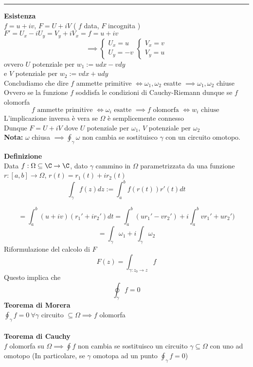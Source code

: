 \noindent\rule{\textwidth}{0.5pt}
\textbf{Esistenza}
\\$f=u+iv$, $F=U+iV$ ( $f$ data, $F$ incognita )
\\$F'=U_x-iU_y=V_y+iV_x=f=u+iv$
\[
	\implies \begin{cases}
	U_x=u\\U_y=-v
\end{cases}
	\begin{cases}
	V_x=v\\V_y=u
\end{cases}
\]
ovvero $U$ potenziale per $w_1:=udx-vdy$
\\e $V$ potenziale per $w_2:=vdx+udy$
\\Concludiamo che dire $f$ ammette primitive $\iff\omega_1,\omega_2$ esatte $\implies\omega_1,\omega_2$ chiuse
\\Ovvero se la funzione $f$ soddisfa le condizioni di Cauchy-Riemann dunque se $f$ olomorfa
\[f\text{ ammette primitive }\iff\omega_i \text{ esatte }\implies f \text{ olomorfa }\iff w_i\text{ chiuse }\]
L'implicazione inversa è vera se $\Omega$ è semplicemente connesso
\\Dunque $F=U+iV$ dove $U$ potenziale per $\omega_1$, $V$ potenziale per $\omega_2$
\\\textbf{Nota: } $\omega$ chiusa $\implies \oint_\gamma \omega$ non cambia se sostituisco $\gamma$ con un circuito omotopo. 
\begin{tcolorbox}
	\textbf{Definizione} 
	\\Data $f:\Omega\subseteq\C\to \C$, dato $\gamma$ cammino in $\Omega$ parametrizzata da una funzione $r:[a,b]\to \Omega$, $r(t)=r_1(t)+ir_2(t)$
	\[\int_{\gamma}^{} f(z)dz:=\int_{a}^{b} f(r(t))r'(t)dt\]

\end{tcolorbox}
	\[=\int_{a}^{b} (u+iv)(r_1'+ir_2')dt=\int_{a}^{b} (ur_1'-vr_2')+i \int_{a}^{b} vr_1'+ur_2')\]
	\[=\int_{\gamma}^{} \omega_1+i \int_{\gamma}^{}\omega_2\]
Riformulazione del calcolo di $F$
\[F(z)=\int_{\gamma:z_0\to z}^{} f \]
Questo implica che \[\oint_\gamma f=0\]
\textbf{Teorema di Morera}
\\ $\oint_\gamma f=0 \ \forall \gamma $ circuito $\subseteq \Omega \implies f$ olomorfa
\\\\\textbf{Teorema di Cauchy}
\\$f$ olomorfa su $\Omega\implies\oint f$ non cambia se sostituisco un circuito $\gamma \subseteq\Omega$ con uno ad omotopo (In particolare, se $\gamma$ omotopa ad un punto $\oint_\gamma f=0$)

